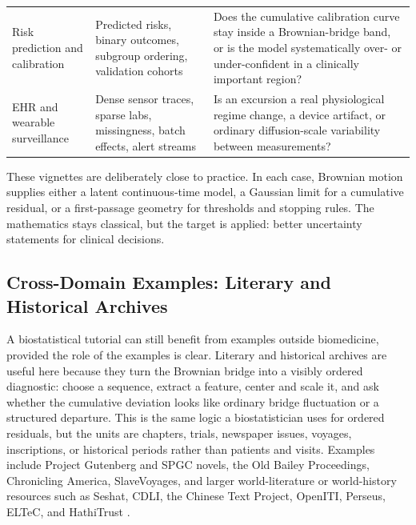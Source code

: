\documentclass{article}
\theoremstyle{plain}
\theoremstyle{definition}
\begin{document}
\begin{table}[H]
\begin{tabularx}{\textwidth}{>{\RaggedRight\arraybackslash}p{}>{\RaggedRight\arraybackslash}p{}>{\RaggedRight\arraybackslash}X}
Risk prediction and calibration &
Predicted risks, binary outcomes, subgroup ordering, validation cohorts &
Does the cumulative calibration curve stay inside a Brownian-bridge band, or is the model systematically over- or under-confident in a clinically important region? \\
EHR and wearable surveillance &
Dense sensor traces, sparse labs, missingness, batch effects, alert streams &
Is an excursion a real physiological regime change, a device artifact, or ordinary diffusion-scale variability between measurements? \\
\bottomrule
\end{tabularx}
\end{table}

These vignettes are deliberately close to practice. In each case, Brownian motion supplies either a latent continuous-time model, a Gaussian limit for a cumulative residual, or a first-passage geometry for thresholds and stopping rules. The mathematics stays classical, but the target is applied: better uncertainty statements for clinical decisions.

\subsection{Cross-Domain Examples: Literary and Historical Archives}

A biostatistical tutorial can still benefit from examples outside
biomedicine, provided the role of the examples is clear. Literary and
historical archives are useful here because they turn the Brownian bridge
into a visibly ordered diagnostic: choose a sequence, extract a feature,
center and scale it, and ask whether the cumulative deviation looks like
ordinary bridge fluctuation or a structured departure. This is the same
logic a biostatistician uses for ordered residuals, but the units are
chapters, trials, newspaper issues, voyages, inscriptions, or historical
periods rather than patients and visits.
Examples include Project Gutenberg and SPGC novels, the Old Bailey
Proceedings, Chronicling America, SlaveVoyages, and larger world-literature
or world-history resources such as Seshat, CDLI, the Chinese Text Project,
OpenITI, Perseus, ELTeC, and HathiTrust
\citep{projectgutenberg,gerlach2020standardized,oldbaileyonline,chroniclingamerica,slavevoyages,seshat2026,cdli2026,ctext2026,openiti2026,perseus2026,eltec2021,hathitrust2026}.
\end{document}
